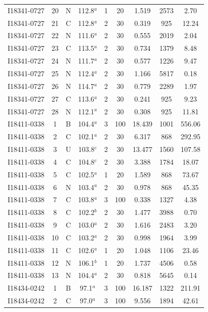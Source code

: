 \begin{table}
\begin{tabular}{ccccccccc}
I18341-0727 & 20 & N & 112.8$^{a}$ & 1 & 20 & 1.519 & 2573 & 2.70 \\
I18341-0727 & 21 & C & 112.8$^{a}$ & 2 & 30 & 0.319 & 925 & 12.24 \\
I18341-0727 & 22 & N & 111.6$^{a}$ & 2 & 30 & 0.555 & 2019 & 2.04 \\
I18341-0727 & 23 & C & 113.5$^{a}$ & 2 & 30 & 0.734 & 1379 & 8.48 \\
I18341-0727 & 24 & N & 111.7$^{a}$ & 2 & 30 & 0.577 & 1226 & 9.47 \\
I18341-0727 & 25 & N & 112.4$^{a}$ & 2 & 30 & 1.166 & 5817 & 0.18 \\
I18341-0727 & 26 & N & 114.7$^{a}$ & 2 & 30 & 0.779 & 2289 & 1.97 \\
I18341-0727 & 27 & C & 113.6$^{a}$ & 2 & 30 & 0.241 & 925 & 9.23 \\
I18341-0727 & 28 & N & 112.1$^{a}$ & 2 & 30 & 0.308 & 925 & 11.81 \\
I18411-0338 & 1 & B & 104.4$^{a}$ & 3 & 100 & 18.439 & 1001 & 556.06 \\
I18411-0338 & 2 & C & 102.1$^{a}$ & 2 & 30 & 6.317 & 868 & 292.95 \\
I18411-0338 & 3 & U & 103.8$^{c}$ & 2 & 30 & 13.477 & 1560 & 107.58 \\
I18411-0338 & 4 & C & 104.8$^{c}$ & 2 & 30 & 3.388 & 1784 & 18.07 \\
I18411-0338 & 5 & C & 102.5$^{a}$ & 1 & 20 & 1.589 & 868 & 73.67 \\
I18411-0338 & 6 & N & 103.4$^{a}$ & 2 & 30 & 0.978 & 868 & 45.35 \\
I18411-0338 & 7 & C & 103.8$^{a}$ & 3 & 100 & 0.338 & 1327 & 4.38 \\
I18411-0338 & 8 & C & 102.2$^{b}$ & 2 & 30 & 1.477 & 3988 & 0.70 \\
I18411-0338 & 9 & C & 103.0$^{a}$ & 2 & 30 & 1.616 & 2483 & 3.20 \\
I18411-0338 & 10 & C & 103.2$^{a}$ & 2 & 30 & 0.998 & 1964 & 3.99 \\
I18411-0338 & 11 & C & 102.6$^{a}$ & 1 & 20 & 1.048 & 1106 & 23.46 \\
I18411-0338 & 12 & N & 106.1$^{b}$ & 1 & 20 & 1.737 & 4506 & 0.58 \\
I18411-0338 & 13 & N & 104.4$^{a}$ & 2 & 30 & 0.818 & 5645 & 0.14 \\
I18434-0242 & 1 & B & 97.1$^{a}$ & 3 & 100 & 16.187 & 1322 & 211.91 \\
I18434-0242 & 2 & C & 97.0$^{a}$ & 3 & 100 & 9.556 & 1894 & 42.61 \\

\end{tabular}
\end{table}
